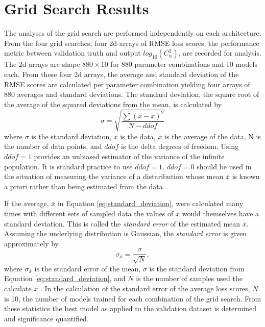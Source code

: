 \section{Grid Search Results}
The analyses of the grid search are performed independently on each architecture. From the four grid searches, four 2d-arrays of \ac{RMSE} loss scores, the performance metric between validation truth and output $log_{10}(C_{n}^{2})$, are recorded for analysis. The 2d-arrays are shape $880 \times 10$ for 880 parameter combinations and 10 models each. From these four 2d arrays, the average and standard deviation of the \ac{RMSE} scores are calculated per parameter combination yielding four arrays of 880 averages and standard deviations. The standard deviation, the square root of the average of the squared deviations from the mean, is calculated by
\begin{equation} \label{eq:standard_deviation}
	\sigma = \sqrt{\frac{\sum\left(x - \bar{x}\right)^{2}}{N - ddof}}
\end{equation}
where $\sigma$ is the standard deviation, $x$ is the data, $\bar{x}$ is the average of the data, N is the number of data points, and $ddof$ is the delta degrees of freedom. Using $ddof = 1$ provides an unbiased estimator of the variance of the infinite population. It is standard practice to use $ddof = 1$. $ddof = 0$ should be used in the situation of measuring the variance of a distaribution whose mean $\bar{x}$ is known a priori rather than being estimated from the data \cite{10.5555/1403886}.

If the average, $\bar{x}$ in Equation \ref{eq:standard_deviation}, were calculated many times with different sets of sampled data the values of $\bar{x}$ would themselves have a standard deviation. This is called the \textit{standard error} of the estimated mean $\bar{x}$. Assuming the underlying distribution is Gaussian, the \textit{standard error} is given approximately by
\begin{equation} \label{eq:standard_error}
	\sigma_{\bar{x}} = \frac{\sigma}{\sqrt{N}},
\end{equation}
where $\sigma_{\bar{x}}$ is the standard error of the mean, $\sigma$ is the standard deviation from Equation \ref{eq:standard_deviation}, and $N$ is the number of samples used the calculate $\bar{x}$ \cite{10.5555/1403886}. In the calculation of the standard error of the average loss scores, $N$ is 10, the number of models trained for each combination of the grid search. From these statistics the best model as applied to the validation dataset is determined and significance quantified.

